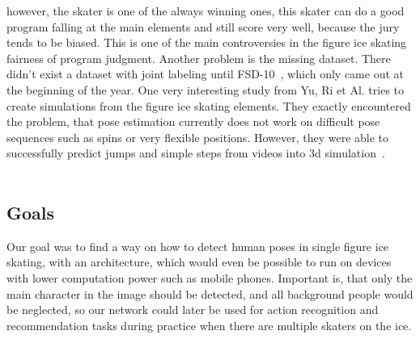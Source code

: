     however, the skater is one of the always winning
    ones, this skater can do a good program falling at the main elements and still score very well, because the
    jury tends to be biased.
    This is one of the main controversies in the figure ice skating fairness of program judgment.
    Another problem is the missing dataset.
    There didn't exist a dataset with joint labeling until FSD-10~\cite{fsd10}, which only came out at the
    beginning of the year.
    One very interesting study from Yu, Ri et Al. tries to create simulations from the figure ice skating elements.
    They exactly encountered the problem, that pose estimation currently does not work on difficult pose sequences
    such as spins or very flexible positions.
    However, they were able to successfully predict jumps and simple steps from videos into 3d
    simulation~\cite{simplebaselines}.
\\\mbox{}\\
    \subsection*{Goals}
    Our goal was to find a way on how to detect human poses in single figure ice skating, with an architecture, which would even
    be possible to run on devices with lower computation power such as mobile phones.
    Important is, that only the main character in the image should be detected, and all background people would be
    neglected, so our network could later be used for action recognition and recommendation tasks during practice when
    there are multiple skaters on the ice.
\\\mbox{}\\
